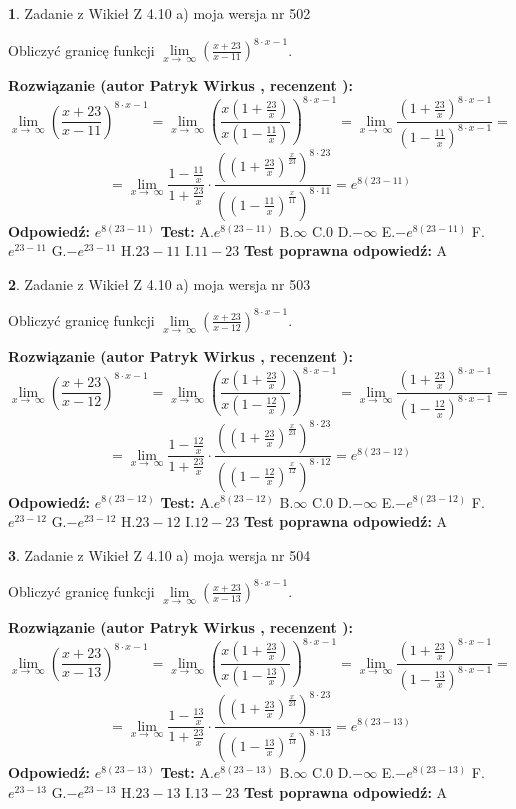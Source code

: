 \documentclass[12pt, a4paper]{article}
\theoremstyle{definition} %
\newtheorem{zad}{}
\newcommand{\zadStart}[1]{\begin{zad}#1\newline}
\newcommand{\zadStop}{\end{zad}}
\newcommand{\rozwStart}[2]{\noindent \textbf{Rozwiązanie (autor #1 , recenzent #2): }\newline}
\newcommand{\rozwStop}{\newline}
\newcommand{\odpStart}{\noindent \textbf{Odpowiedź:}\newline}
\newcommand{\odpStop}{\newline}
\newcommand{\testStart}{\noindent \textbf{Test:}\newline}
\newcommand{\testStop}{\newline}
\newcommand{\kluczStart}{\noindent \textbf{Test poprawna odpowiedź:}\newline}
\newcommand{\kluczStop}{\newline}
\begin{document}
\zadStart{Zadanie z Wikieł Z 4.10 a) moja wersja nr 502}


Obliczyć granicę funkcji  $\lim\limits_{x\to\ \infty}(\frac{x+23}{x-11})^{8\cdot x-1}$.
\zadStop
\rozwStart{Patryk Wirkus}{}
$$\lim\limits_{x\to\ \infty}(\frac{x+23}{x-11})^{8\cdot x-1} = \lim\limits_{x\to\ \infty}(\frac{x(1+\frac{23}{x})}{x(1-\frac{11}{x})})^{8\cdot x-1}=\lim\limits_{x\to\ \infty}\frac{(1+\frac{23}{x})^{8\cdot x-1}}{(1-\frac{11}{x})^{8\cdot x-1}}=$$
$$=\lim\limits_{x\to\ \infty}\frac{1-\frac{11}{x}}{1+\frac{23}{x}}\cdot\frac{((1+\frac{23}{x})^{\frac{x}{23}})^{8\cdot23}}{((1-\frac{11}{x})^{\frac{x}{11}})^{8\cdot11}}=e^{8(23-11)}$$
\rozwStop
\odpStart
$e^{8(23-11)}$
\odpStop
\testStart
A.$e^{8(23-11)}$ B.$\infty$ C.$0$ D.$-\infty$ E.$-e^{8(23-11)}$
F.$e^{23-11}$ G.$-e^{23-11}$
H.$23-11$
I.$11-23$
\testStop
\kluczStart
A
\kluczStop



\zadStart{Zadanie z Wikieł Z 4.10 a) moja wersja nr 503}


Obliczyć granicę funkcji  $\lim\limits_{x\to\ \infty}(\frac{x+23}{x-12})^{8\cdot x-1}$.
\zadStop
\rozwStart{Patryk Wirkus}{}
$$\lim\limits_{x\to\ \infty}(\frac{x+23}{x-12})^{8\cdot x-1} = \lim\limits_{x\to\ \infty}(\frac{x(1+\frac{23}{x})}{x(1-\frac{12}{x})})^{8\cdot x-1}=\lim\limits_{x\to\ \infty}\frac{(1+\frac{23}{x})^{8\cdot x-1}}{(1-\frac{12}{x})^{8\cdot x-1}}=$$
$$=\lim\limits_{x\to\ \infty}\frac{1-\frac{12}{x}}{1+\frac{23}{x}}\cdot\frac{((1+\frac{23}{x})^{\frac{x}{23}})^{8\cdot23}}{((1-\frac{12}{x})^{\frac{x}{12}})^{8\cdot12}}=e^{8(23-12)}$$
\rozwStop
\odpStart
$e^{8(23-12)}$
\odpStop
\testStart
A.$e^{8(23-12)}$ B.$\infty$ C.$0$ D.$-\infty$ E.$-e^{8(23-12)}$
F.$e^{23-12}$ G.$-e^{23-12}$
H.$23-12$
I.$12-23$
\testStop
\kluczStart
A
\kluczStop



\zadStart{Zadanie z Wikieł Z 4.10 a) moja wersja nr 504}


Obliczyć granicę funkcji  $\lim\limits_{x\to\ \infty}(\frac{x+23}{x-13})^{8\cdot x-1}$.
\zadStop
\rozwStart{Patryk Wirkus}{}
$$\lim\limits_{x\to\ \infty}(\frac{x+23}{x-13})^{8\cdot x-1} = \lim\limits_{x\to\ \infty}(\frac{x(1+\frac{23}{x})}{x(1-\frac{13}{x})})^{8\cdot x-1}=\lim\limits_{x\to\ \infty}\frac{(1+\frac{23}{x})^{8\cdot x-1}}{(1-\frac{13}{x})^{8\cdot x-1}}=$$
$$=\lim\limits_{x\to\ \infty}\frac{1-\frac{13}{x}}{1+\frac{23}{x}}\cdot\frac{((1+\frac{23}{x})^{\frac{x}{23}})^{8\cdot23}}{((1-\frac{13}{x})^{\frac{x}{13}})^{8\cdot13}}=e^{8(23-13)}$$
\rozwStop
\odpStart
$e^{8(23-13)}$
\odpStop
\testStart
A.$e^{8(23-13)}$ B.$\infty$ C.$0$ D.$-\infty$ E.$-e^{8(23-13)}$
F.$e^{23-13}$ G.$-e^{23-13}$
H.$23-13$
I.$13-23$
\testStop
\kluczStart
A
\kluczStop
\end{document}
